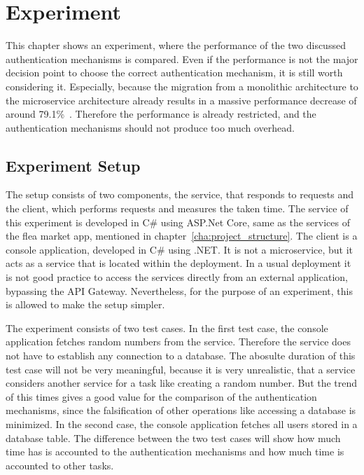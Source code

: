 \chapter{Experiment}
\label{cha:experiment}
This chapter shows an experiment, where the performance of the two discussed authentication mechanisms is compared.
Even if the performance is not the major decision point to choose the correct authentication mechanism, it is still worth considering it.
Especially, because the migration from a monolithic architecture to the microservice architecture already results in a massive performance decrease of around 79.1\%~\cite{ueda2016workload}.
Therefore the performance is already restricted, and the authentication mechanisms should not produce too much overhead.

\section{Experiment Setup}
The setup consists of two components, the service, that responds to requests and the client, which performs requests and measures the taken time.
The service of this experiment is developed in C\# using ASP.Net Core, same as the services of the flea market app, mentioned in chapter~\ref{cha:project_structure}.
The client is a console application, developed in C\# using .NET.
It is not a microservice, but it acts as a service that is located within the deployment.
In a usual deployment it is not good practice to access the services directly from an external application, bypassing the API Gateway.
Nevertheless, for the purpose of an experiment, this is allowed to make the setup simpler. 

The experiment consists of two test cases.
In the first test case, the console application fetches random numbers from the service.
Therefore the service does not have to establish any connection to a database.
The abosulte duration of this test case will not be very meaningful, because it is very unrealistic, that a service considers another service for a task like creating a random number.
But the trend of this times gives a good value for the comparison of the authentication mechanisms, since the falsification of other operations like accessing a database is minimized.
In the second case, the console application fetches all users stored in a database table.
The difference between the two test cases will show how much time has is accounted to the authentication mechanisms and how much time is accounted to other tasks.

